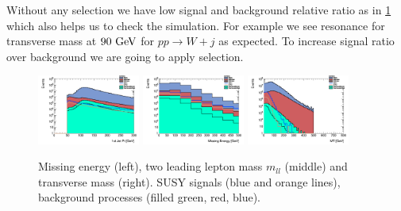 \documentclass[tightenline,notitlepage,nofootinbib]{revtex4-1}
\begin{document}

Without any selection we have low signal and background relative ratio as in \cref{fig:nocuts} which also helps us to check the simulation. For example we see resonance for transverse mass at $90~\rm{GeV}$ for $pp \to W +j$ as expected. To increase signal ratio over background we are going to apply selection.
\clearpage
\begin{figure}[!ht]
  \centering
  \includegraphics[width=0.3\textwidth]{h_PtJets1st.png}
  \includegraphics[width=0.3\textwidth]{h_MET.png}
  \includegraphics[width=0.3\textwidth]{h_MT.png}
  \caption{Missing energy (left), two leading lepton mass $m_{ll}$ (middle) and transverse mass (right). SUSY signals (blue and orange lines), background processes (filled green, red, blue). }
  \label{fig:nocuts}
\end{figure}
\end{document}
